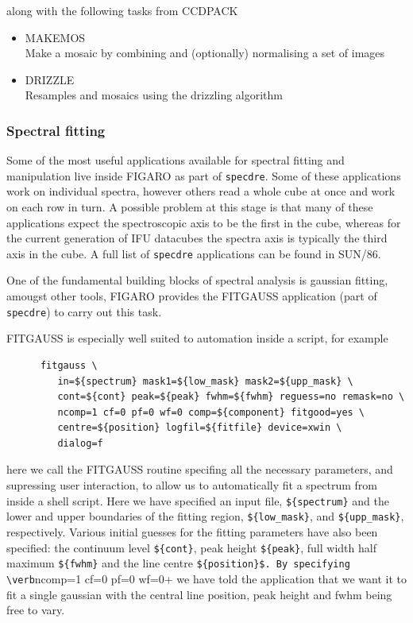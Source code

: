 \documentclass[twoside,11pt]{article}
\newcommand{\xref}[3]{#1}
\begin{document}
along with the following tasks from \xref{CCDPACK}{sun139}{}

\begin{itemize}
\item{\xref{MAKEMOS}{sun139}{MAKEMOS}}\\
Make a mosaic by combining and (optionally) normalising a set of images 
\item{\xref{DRIZZLE}{sun139}{DRIZZLE}}\\
Resamples and mosaics using the drizzling algorithm
\end{itemize}

\subsubsection{Spectral fitting}

Some of the most useful applications available for spectral fitting and manipulation live inside \xref{FIGARO}{sun86}{} as part of \xref{{\tt specdre}}{sun86}{specdre}. Some of these applications work on individual spectra, however others read a whole cube at once and work on each row in turn. A possible problem at this stage is that many of these applications expect the spectroscopic axis to be the first in the cube, whereas for the current generation of IFU datacubes the spectra axis is typically the third axis in the cube. A full list of \xref{{\tt specdre} applications}{sun86}{classifspecdre} can be found in SUN/86. 

One of the fundamental building blocks of spectral analysis is gaussian fitting, amougst other tools, FIGARO provides the \xref{FITGAUSS}{sun86}{FITGAUSS} application (part of {\tt specdre}) to  carry out this task.

FITGAUSS is especially well suited to automation inside a script, for example

\small\begin{verbatim}
      fitgauss \
         in=${spectrum} mask1=${low_mask} mask2=${upp_mask} \
         cont=${cont} peak=${peak} fwhm=${fwhm} reguess=no remask=no \
         ncomp=1 cf=0 pf=0 wf=0 comp=${component} fitgood=yes \
         centre=${position} logfil=${fitfile} device=xwin \
         dialog=f 
\end{verbatim}\normalsize

here we call the FITGAUSS routine specifing all the necessary parameters, and supressing user interaction, to allow us to automatically fit a spectrum from inside a shell script. Here we have specified an input file, \verb+${spectrum}+ and the lower and upper boundaries of the fitting region, \verb+${low_mask}+, and \verb+${upp_mask}+, respectively. Various initial guesses for the fitting parameters have also been specified: the continuum level \verb+${cont}+, peak height \verb+${peak}+, full width half maximum \verb+${fwhm}+ and the line centre \verb+${position}$. By specifying \verb+ncomp=1 cf=0 pf=0 wf=0+ we have told the application that we want it to fit a single gaussian with the central line position, peak height and fwhm being free to vary.
\end{document}
